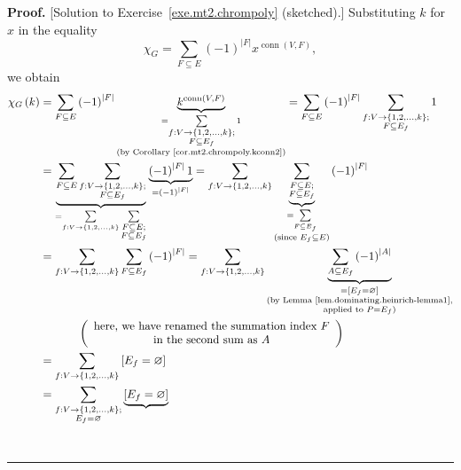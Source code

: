 \documentclass[numbers=enddot,12pt,final,onecolumn,notitlepage]{scrartcl}%
\theoremstyle{definition}
\newenvironment{proof}[1][Proof]{\noindent\textbf{#1.} }{\ \rule{0.5em}{0.5em}}
\let\sumnonlimits\sum
\renewcommand{\sum}{\sumnonlimits\limits}
\newcommand{\conn}{\operatorname{conn}}
\newcommand{\set}[1]{\left\{ #1 \right\}}
\newcommand{\abs}[1]{\left| #1 \right|}
\newcommand{\tup}[1]{\left( #1 \right)}
\newcommand{\ive}[1]{\left[ #1 \right]}
\newcommand{\underbrack}[2]{\underbrace{#1}_{\substack{#2}}}
\begin{document}
\begin{proof}
[Solution to Exercise~\ref{exe.mt2.chrompoly} (sketched).]
Substituting $k$ for $x$ in the equality
\[
\chi_G
=
\sum_{F\subseteq E} \tup{-1}^{\abs{F}} x^{ \conn \tup{V, F} },
\]
we obtain
\begin{align*}
\chi_G \tup{k}
&= \sum_{F\subseteq E} \tup{-1}^{\abs{F}}
\underbrack{k^{ \conn \tup{V, F}  }}
           { =\sum_{\substack{f : V \to \set{1, 2, \ldots, k};\\
             F\subseteq E_f }} 1
            \\ \text{(by Corollary \ref{cor.mt2.chrompoly.kconn2})}}
= \sum_{F\subseteq E} \tup{-1}^{\abs{F}}
  \sum_{\substack{f:V \to \set{1, 2, \ldots, k } ; \\ F\subseteq E_f }}
  1\\
&  =\underbrace{\sum_{F\subseteq E}\sum_{\substack{f:V\rightarrow\left\{
1,2,\ldots,k\right\}  ;\\F\subseteq E_f }}}_{=\sum_{f:V\rightarrow\left\{
1,2,\ldots,k\right\}  }\sum_{\substack{F\subseteq E;\\F\subseteq E_f }%
}}\underbrace{\left(  -1\right)  ^{\left\vert F\right\vert }1}_{=\left(
-1\right)  ^{\left\vert F\right\vert }}=\sum_{f:V\rightarrow\left\{
1,2,\ldots,k\right\}  }\underbrace{\sum_{\substack{F\subseteq E;\\F\subseteq
E_f }}}_{\substack{=\sum_{F\subseteq E_f }\\\text{(since }E_f \subseteq
E\text{)}}}\left(  -1\right)  ^{\left\vert F\right\vert }\\
&  =\sum_{f:V \to \set{1, 2, \ldots, k} }\sum_{F\subseteq
E_f }\left(  -1\right)  ^{\left\vert F\right\vert }=\sum_{f:V\rightarrow
 \set{1, 2, \ldots, k} }\underbrace{\sum_{A\subseteq E_f }\left(
-1\right)  ^{\left\vert A\right\vert }}_{\substack{=\left[  E_f
=\varnothing\right]  \\
\text{(by Lemma \ref{lem.dominating.heinrich-lemma1},}\\
\text{applied to }P=E_f \text{)}}}\\
&  \ \ \ \ \ \ \ \ \ \ \left(
\begin{array}[c]{c}
\text{here, we have renamed the summation index }F\\
\text{in the second sum as }A
\end{array}
\right)  \\
&  =\sum_{f:V \to \set{1, 2, \ldots, k} }
  \ive{ E_f =\varnothing }  \\
&  =\sum_{\substack{f:V\rightarrow\left\{  1,2,\ldots,k\right\}
;\\E_f =\varnothing}}\underbrace{\left[  E_f =\varnothing\right]
}
\end{align*}
\end{proof}
\end{document}
